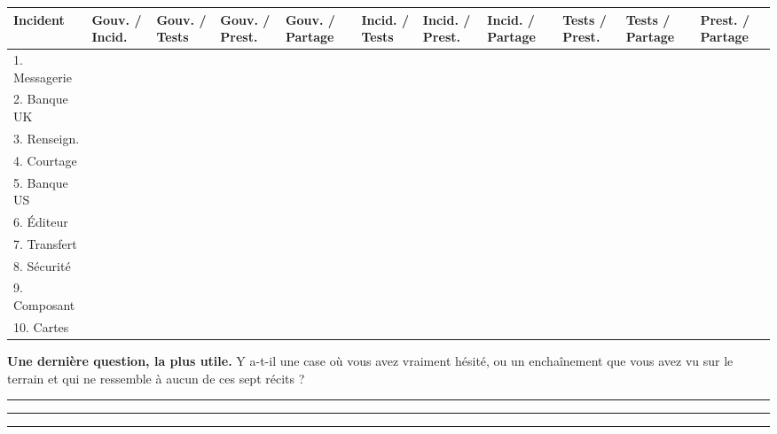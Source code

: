 \documentclass[11pt,a4paper]{article}
\begin{document}
\vspace{3mm}
\begin{center}\scriptsize
\renewcommand{\arraystretch}{2.7}
\setlength{\tabcolsep}{2pt}
\begin{tabular}{@{}p{2.05cm}|p{1.36cm}|p{1.36cm}|p{1.36cm}|p{1.36cm}|p{1.36cm}|p{1.36cm}|p{1.36cm}|p{1.36cm}|p{1.36cm}|p{1.36cm}@{}}
\toprule
\textbf{Incident} & Gouv. \newline / Incid. & Gouv. \newline / Tests & Gouv. \newline / Prest. &
Gouv. \newline / Partage & Incid. \newline / Tests & Incid. \newline / Prest. &
Incid. \newline / Partage & Tests \newline / Prest. & Tests \newline / Partage &
Prest. \newline / Partage \\
\midrule
1. Messagerie & & & & & & & & & & \\ \hline
2. Banque UK & & & & & & & & & & \\ \hline
3. Renseign. & & & & & & & & & & \\ \hline
4. Courtage & & & & & & & & & & \\ \hline
5. Banque US & & & & & & & & & & \\ \hline
6. Éditeur & & & & & & & & & & \\ \hline
7. Transfert & & & & & & & & & & \\ \hline
8. Sécurité & & & & & & & & & & \\ \hline
9. Composant & & & & & & & & & & \\ \hline
10. Cartes & & & & & & & & & & \\
\bottomrule
\end{tabular}
\end{center}

\vspace{4mm}
\textbf{Une dernière question, la plus utile.} Y a-t-il une case où vous avez vraiment hésité, ou
un enchaînement que vous avez vu sur le terrain et qui ne ressemble à aucun de ces sept récits ?

\vspace{12mm}\hrule\vspace{1mm}\hrule\vspace{1mm}\hrule
\end{document}
